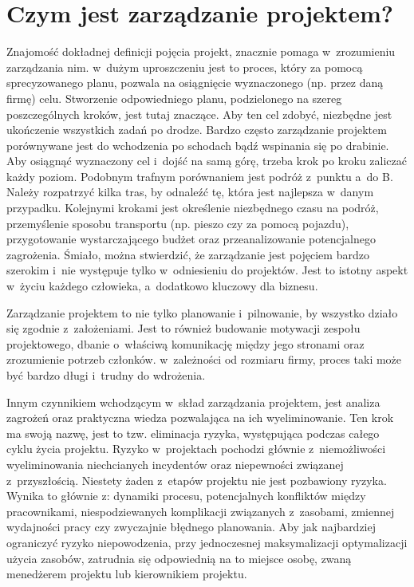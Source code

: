\documentclass[oneside,polski,logo]{amuthesis}
\begin{document}
\section {Czym jest zarządzanie projektem?}
Znajomość dokładnej definicji pojęcia projekt, znacznie pomaga w~zrozumieniu zarządzania nim. w~dużym uproszczeniu jest to proces, który za pomocą sprecyzowanego planu, pozwala na osiągnięcie wyznaczonego (np. przez daną firmę) celu. Stworzenie odpowiedniego planu, podzielonego na szereg poszczególnych kroków, jest tutaj znaczące. Aby ten cel zdobyć, niezbędne jest ukończenie wszystkich zadań po drodze. Bardzo często zarządzanie projektem porównywane jest do wchodzenia po schodach bądź wspinania się po drabinie. Aby osiągnąć wyznaczony cel i~dojść na samą górę, trzeba krok po kroku zaliczać każdy poziom. Podobnym trafnym porównaniem jest podróż z~punktu a~do B. Należy rozpatrzyć kilka tras, by odnaleźć tę, która jest najlepsza w~danym przypadku. Kolejnymi krokami jest określenie niezbędnego czasu na podróż, przemyślenie sposobu transportu (np. pieszo czy za pomocą pojazdu), przygotowanie wystarczającego budżet oraz przeanalizowanie potencjalnego zagrożenia. Śmiało, można stwierdzić, że zarządzanie jest pojęciem bardzo szerokim i~nie występuje tylko w~odniesieniu do projektów. Jest to istotny aspekt w~życiu każdego człowieka, a~dodatkowo kluczowy dla biznesu. \cite{zarzadzanie7}
 
Zarządzanie projektem to nie tylko planowanie i~pilnowanie, by wszystko działo się zgodnie z~założeniami. Jest to również budowanie motywacji zespołu projektowego, dbanie o~właściwą komunikację między jego stronami oraz zrozumienie potrzeb członków. w~zależności od rozmiaru firmy, proces taki może być bardzo długi i~trudny do wdrożenia.

Innym czynnikiem wchodzącym w~skład zarządzania projektem, jest analiza zagrożeń oraz praktyczna wiedza pozwalająca na ich wyeliminowanie. Ten krok ma swoją nazwę, jest to tzw. eliminacja ryzyka, występująca podczas całego cyklu życia projektu. Ryzyko w~projektach pochodzi głównie z~niemożliwości wyeliminowania niechcianych incydentów oraz niepewności związanej z~przyszłością. Niestety żaden z~etapów projektu nie jest pozbawiony ryzyka. Wynika to głównie z: dynamiki procesu, potencjalnych konfliktów między pracownikami, niespodziewanych komplikacji związanych z~zasobami, zmiennej wydajności pracy czy zwyczajnie błędnego planowania. Aby jak najbardziej ograniczyć ryzyko niepowodzenia, przy jednoczesnej maksymalizacji optymalizacji użycia zasobów, zatrudnia się odpowiednią na to miejsce osobę, zwaną menedżerem projektu lub kierownikiem projektu.
\newpage
\end{document}
